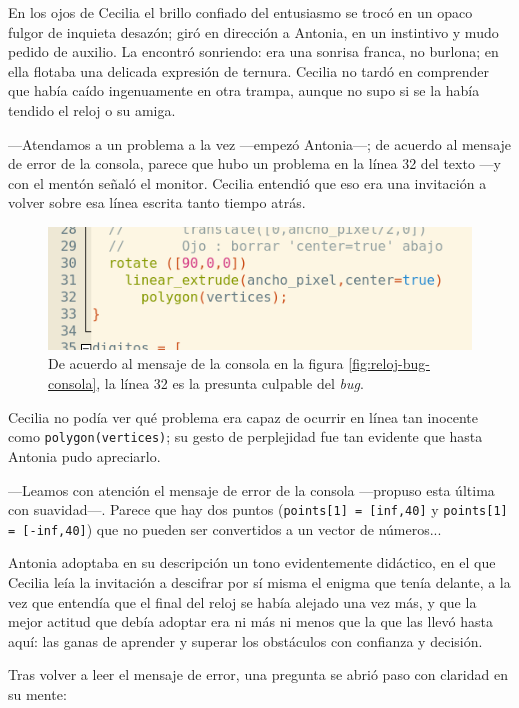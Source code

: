 En los ojos de Cecilia el brillo confiado del entusiasmo se trocó en
un opaco fulgor de inquieta desazón; giró en dirección a Antonia, en
un instintivo y mudo pedido de auxilio. La encontró sonriendo: era una
sonrisa franca, no burlona; en ella flotaba una delicada expresión de
ternura. Cecilia no tardó en comprender que había caído ingenuamente
en otra trampa, aunque no supo si se la había tendido el reloj o su
amiga.

---Atendamos a un problema a la vez ---empezó An\-to\-nia---; de acuerdo
al mensaje de error de la consola, parece que hubo un problema en la
línea 32 del texto ---y con el mentón señaló el monitor. Cecilia
entendió que eso era una invitación a volver sobre esa línea escrita
tanto tiempo atrás.


\begin{figure}[ht]
  \centering
  \includegraphics[width=.8\textwidth]{imagenes/bug-linea-32}
  \caption[Línea culpable del \emph{bug}.]{De acuerdo al mensaje de la
    consola en la figura \ref{fig:reloj-bug-consola}, la línea 32 es
    la presunta culpable del \emph{bug}.}
  \label{fig:bug-linea-32}
\end{figure}


Cecilia no podía ver qué problema era capaz de ocurrir en línea tan
inocente como \lstinline!polygon(vertices)!; su gesto de perplejidad
fue tan evidente que hasta Antonia pudo apreciarlo.

---Leamos con atención el mensaje de error de la consola ---pro\-pu\-so
esta última con suavidad---. Parece que hay dos puntos
(\lstinline!points[1] = [inf,40]! y \lstinline!points[1] = [-inf,40]!)
que no pueden ser convertidos a un vector de números...

Antonia adoptaba en su descripción un tono evidentemente didáctico, en
el que Cecilia leía la invitación a descifrar por sí misma el enigma
que tenía delante, a la vez que entendía que el final del reloj se
había alejado una vez más, y que la mejor actitud que debía adoptar
era ni más ni menos que la que las llevó hasta aquí: las ganas de
aprender y superar los obstáculos con confianza y decisión.

Tras volver a leer el mensaje de error, una pregunta se abrió paso con
claridad en su mente:

